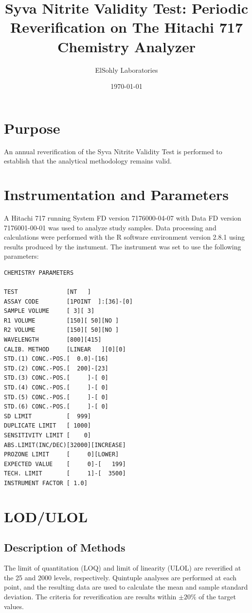 \documentclass[article,11pt,oneside]{memoir}
\title{Syva Nitrite Validity Test: Periodic Reverification on The Hitachi 717 Chemistry Analyzer}
\author{ElSohly Laboratories}
\date{\today}
\begin{document}
\maketitle
\tableofcontents
\chapter{Purpose}
An annual reverification of the Syva Nitrite Validity Test is performed to establish that the analytical methodology remains valid.

\chapter{Instrumentation and Parameters}
A Hitachi 717 running System FD version 7176000-04-07 with Data FD version 7176001-00-01 was used to analyze study samples.
Data processing and calculations were performed with the R software environment version 2.8.1\cite{R-Development-Core-Team:2008th} using results produced by the instument.
The instrument was set to use the following parameters:

\begin{minipage}{3in}
\begin{verbatim}
CHEMISTRY PARAMETERS

TEST              [NT   ]
ASSAY CODE        [1POINT  ]:[36]-[0]
SAMPLE VOLUME     [ 3][ 3]
R1 VOLUME         [150][ 50][NO ]
R2 VOLUME         [150][ 50][NO ]
WAVELENGTH        [800][415]
CALIB. METHOD     [LINEAR   ][0][0]
STD.(1) CONC.-POS.[  0.0]-[16]
STD.(2) CONC.-POS.[  200]-[23]
STD.(3) CONC.-POS.[     ]-[ 0]
STD.(4) CONC.-POS.[     ]-[ 0]
STD.(5) CONC.-POS.[     ]-[ 0]
STD.(6) CONC.-POS.[     ]-[ 0]
SD LIMIT          [  999]
DUPLICATE LIMIT   [ 1000]
SENSITIVITY LIMIT [    0]
ABS.LIMIT(INC/DEC)[32000][INCREASE]
PROZONE LIMIT     [     0][LOWER]
EXPECTED VALUE    [     0]-[   199]
TECH. LIMIT       [     1]-[  3500]
INSTRUMENT FACTOR [ 1.0]
\end{verbatim}
\end{minipage}

\chapter{LOD/ULOL}
\section{Description of Methods}
The limit of quantitation (LOQ) and limit of linearity (ULOL) are reverified at the 25 and \unit{2000}{\micro\gram\per\milli\liter} levels, respectively.
Quintuple analyses are performed at each point, and the resulting data are used to calculate the mean and sample standard deviation.
The criteria for reverification are results within \(\pm 20\%\) of the target values.
\end{document}
